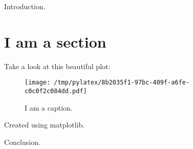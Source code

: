 \documentclass{article}%
\begin{document}
%
\normalsize%
Introduction.%
\section*{I am a section}%
Take a look at this beautiful plot:%


\begin{figure}[htbp]%
\centering%
\texttt{[image: /tmp/pylatex/8b2035f1-97bc-409f-a6fe-c0c0f2c084dd.pdf]}%
\caption{I am a caption.}%
\end{figure}

%
Created using matplotlib.

%
Conclusion.%
\end{document}
